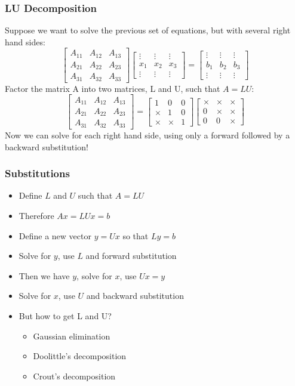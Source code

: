 \begin{frame}[fragile]
  \frametitle{LU Decomposition}
  Suppose we want to solve the previous set of equations, but with several right hand sides:
    \[ 
    \begin{bmatrix}
A_{11} & A_{12} & A_{13}\\ 
A_{21} & A_{22} & A_{23}\\ 
A_{31} & A_{32} & A_{33}
\end{bmatrix}
\begin{bmatrix}
\vdots & \vdots & \vdots \\
x_1 & x_2 & x_3 \\
\vdots & \vdots & \vdots
\end{bmatrix} = 
\begin{bmatrix}
\vdots & \vdots & \vdots \\
b_1 & b_2 & b_3 \\
\vdots & \vdots & \vdots
\end{bmatrix}
\]\pause
Factor the matrix A into two matrices, L and U, such that $A=LU$:
\[ 
    \begin{bmatrix}
A_{11} & A_{12} & A_{13}\\ 
A_{21} & A_{22} & A_{23}\\ 
A_{31} & A_{32} & A_{33}
\end{bmatrix} = 
\begin{bmatrix}
1 & 0 & 0 \\
\times & 1 & 0 \\
\times & \times & 1
\end{bmatrix}
\begin{bmatrix}
\times & \times & \times \\
0 & \times & \times \\
0 & 0 & \times
\end{bmatrix}
\]
Now we can solve for each right hand side, using only a forward
followed by a backward substitution!
\end{frame}

\begin{frame}[fragile]
  \frametitle{Substitutions}
  \begin{itemize}
    \item Define $L$ and $U$ such that $A = LU$
    \item Therefore $Ax = LUx = b$
    \item Define a new vector $y = Ux$ so that $Ly = b$
    \item Solve for $y$, use $L$ and forward substitution
    \item Then we have $y$, solve for $x$, use $Ux = y$
    \item Solve for $x$, use $U$ and backward substitution
    \item But how to get L and U?
    \begin{itemize}
      \item Gaussian elimination
      \item Doolittle's decomposition
      \item Crout's decomposition
    \end{itemize}
  \end{itemize}
\end{frame}

